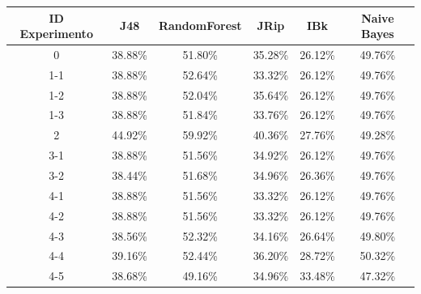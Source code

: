 \documentclass[12pt,a4paper, xcolor=table]{article}
\begin{document}
        \begin{table}[h]
            \centering
            \begin{tabular}{|c|c|c|c|c|c|}
            \hline
            \rowcolor[HTML]{DAE8FC}
            \textbf{ID Experimento} & \textbf{J48} & \textbf{RandomForest} & \textbf{JRip} & \textbf{IBk} & \textbf{Naive Bayes} \\ \hline
            0                       & 38.88\%                   & 51.80\%        & 35.28\%                    & 26.12\%         & 49.76\%            \\ \hline
            1-1                     & 38.88\%                   & 52.64\%        & 33.32\%                    & 26.12\%         & 49.76\%            \\ \hline
            1-2                     & 38.88\%                   & 52.04\%        & 35.64\%                    & 26.12\%         & 49.76\%            \\ \hline
            1-3                     & 38.88\%                   & 51.84\%        & 33.76\%                    & 26.12\%         & 49.76\%            \\ \hline
            2                       & 44.92\%                   & 59.92\%        & 40.36\%                    & 27.76\%         & 49.28\%            \\ \hline
            3-1                     & 38.88\%                   & 51.56\%        & 34.92\%                    & 26.12\%         & 49.76\%            \\ \hline
            3-2                     & 38.44\%                   & 51.68\%        & 34.96\%                    & 26.36\%         & 49.76\%            \\ \hline
            4-1                     & 38.88\%                   & 51.56\%        & 33.32\%                    & 26.12\%         & 49.76\%            \\ \hline
            4-2                     & 38.88\%                   & 51.56\%        & 33.32\%                    & 26.12\%         & 49.76\%            \\ \hline
            4-3                     & 38.56\%                   & 52.32\%        & 34.16\%                    & 26.64\%         & 49.80\%            \\ \hline
            4-4                     & 39.16\%                   & 52.44\%        & 36.20\%                    & 28.72\%         & 50.32\%            \\ \hline
            4-5                     & 38.68\%                   & 49.16\%        & 34.96\%                    & 33.48\%         & 47.32\%            \\ \hline

\end{tabular}
\end{table}
\end{document}
